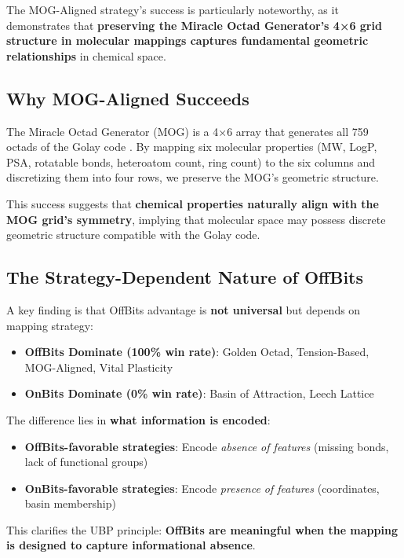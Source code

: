 \documentclass[11pt,letterpaper]{article}
\begin{document}
The MOG-Aligned strategy's success is particularly noteworthy, as it demonstrates that \textbf{preserving the Miracle Octad Generator's 4×6 grid structure in molecular mappings captures fundamental geometric relationships} in chemical space.

\subsection{Why MOG-Aligned Succeeds}

The Miracle Octad Generator (MOG) is a 4×6 array that generates all 759 octads of the Golay code \cite{ConwaySloane1999}. By mapping six molecular properties (MW, LogP, PSA, rotatable bonds, heteroatom count, ring count) to the six columns and discretizing them into four rows, we preserve the MOG's geometric structure.

This success suggests that \textbf{chemical properties naturally align with the MOG grid's symmetry}, implying that molecular space may possess discrete geometric structure compatible with the Golay code.

\subsection{The Strategy-Dependent Nature of OffBits}

A key finding is that OffBits advantage is \textbf{not universal} but depends on mapping strategy:

\begin{itemize}
    \item \textbf{OffBits Dominate (100\% win rate)}: Golden Octad, Tension-Based, MOG-Aligned, Vital Plasticity
    \item \textbf{OnBits Dominate (0\% win rate)}: Basin of Attraction, Leech Lattice
\end{itemize}

The difference lies in \textbf{what information is encoded}:
\begin{itemize}
    \item \textbf{OffBits-favorable strategies}: Encode \textit{absence of features} (missing bonds, lack of functional groups)
    \item \textbf{OnBits-favorable strategies}: Encode \textit{presence of features} (coordinates, basin membership)
\end{itemize}

This clarifies the UBP principle: \textbf{OffBits are meaningful when the mapping is designed to capture informational absence}.
\end{document}
